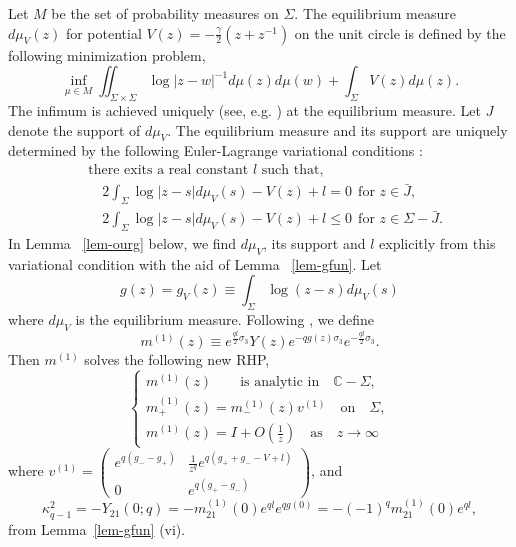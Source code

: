 \documentclass{amsart}
\theoremstyle{definition}
\theoremstyle{remark}
\numberwithin{equation}{section}
\newcommand{\C}{\mathbb C}
\newcommand{\m}[1]{m^{(#1)}(z)}
\newcommand{\mpl}[1]{m_+^{(#1)}(z)}
\newcommand{\mni}[1]{m_-^{(#1)}(z)}
\begin{document}
\bigskip
Let $M$ be the set of probability measures on $\Sigma$.
The equilibrium measure $d\mu_V(z)$ for potential $V(z)=-\frac{\gamma}2(z+z^{-1})$
on the unit circle is defined by the following minimization problem,
\begin{equation}
   \inf_{\mu\in M} \iint_{\Sigma\times\Sigma} \log|z-w|^{-1} d\mu(z) d\mu(w)
+ \int_{\Sigma} V(z) d\mu(z).
\end{equation}
The infimum is achieved uniquely (see, e.g. \cite{ST}) at the 
equilibrium measure.
Let $J$ denote the support of $d\mu_V$.
The equilibrium measure and its support are uniquely determined 
by the following Euler-Lagrange variational conditions :
\begin{equation}\label{e-varicon}
  \begin{split}
  &\text{there exits a real constant $l$ such that},\\
  &\quad 2\int_{\Sigma} \log{|z-s|}d\mu_V(s) - V(z)+l=0 \ \ \text{for $z\in \bar{J}$},\\
  &\quad 2\int_{\Sigma} \log{|z-s|}d\mu_V(s) - V(z)+l \le 0 \ \
\text{for $z\in\Sigma -\bar{J}$}.
  \end{split}
\end{equation}
In Lemma ~\ref{lem-ourg} below, we find $d\mu_V$,
its support and $l$ explicitly from this variational condition 
with the aid of Lemma ~\ref{lem-gfun}.
Let 
\begin{equation}\label{4.8}
  g(z)=g_V(z) \equiv \int_{\Sigma}\log (z-s) d\mu_V(s)
\end{equation}
where $d\mu_V$ is the equilibrium measure.
Following \cite{DKMVZ}, we define 
$$\m1 \equiv 
e^{\frac{ql}{2}\sigma_3}Y(z)e^{-qg(z)\sigma_3} e^{-\frac{ql}{2}\sigma_3}.$$
Then $m^{(1)}$ solves the following new RHP,
\begin{equation}\label{e-m1orig}
  \begin{cases} 
    \m1 \qquad\text{is analytic in}\quad \C-\Sigma,\\
    \mpl1 = \mni1 v^{(1)} \quad\text{on}\quad\Sigma,\\
    \m1=I+O(\frac1z) \quad\text{as}\quad z\rightarrow \infty
  \end{cases}
\end{equation}
where $v^{(1)}=\begin{pmatrix} e^{q(g_--g_+)}& 
\frac{1}{z^q}e^{q(g_++g_--V+l)}\\
0& e^{q(g_+-g_-)} \end{pmatrix}$, 
and 
\begin{equation}\label{e-Korig}
   \kappa^2_{q-1}=-Y_{21}(0;q)=-m_{21}^{(1)}(0)e^{ql}e^{qg(0)}
=-(-1)^qm^{(1)}_{21}(0)e^{ql},
\end{equation}
from Lemma~\ref{lem-gfun} (vi).
\end{document}
